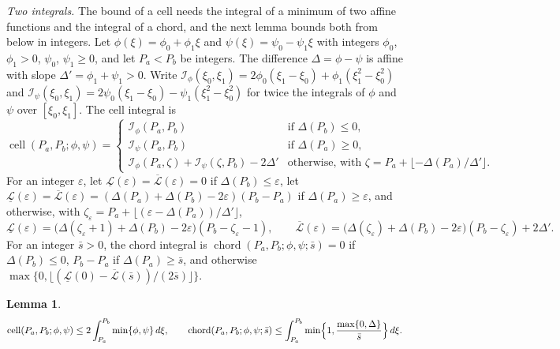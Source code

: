 \documentclass[11pt]{amsart}
\newtheorem{lemma}[theorem]{Lemma}
\theoremstyle{definition}
\numberwithin{equation}{section}
\newcommand{\lean}[1]{\ignorespaces}
\begin{document}
\emph{Two integrals.} The bound of a cell needs the integral of a minimum of two affine functions and the integral of a chord, and the next lemma bounds both from below in integers. Let $\phi(\xi)=\phi_0+\phi_1\xi$ and $\psi(\xi)=\psi_0-\psi_1\xi$ with integers $\phi_0$, $\phi_1>0$, $\psi_0$, $\psi_1\ge0$, and let $P_a<P_b$ be integers. The difference $\Delta=\phi-\psi$ is affine with slope $\Delta'=\phi_1+\psi_1>0$. Write $\mathcal I_\phi(\xi_0,\xi_1)=2\phi_0(\xi_1-\xi_0)+\phi_1(\xi_1^2-\xi_0^2)$ and $\mathcal I_\psi(\xi_0,\xi_1)=2\psi_0(\xi_1-\xi_0)-\psi_1(\xi_1^2-\xi_0^2)$ for twice the integrals of $\phi$ and $\psi$ over $[\xi_0,\xi_1]$. The cell integral is
\[
\operatorname{cell}(P_a,P_b;\phi,\psi)=\begin{cases}\mathcal I_\phi(P_a,P_b)&\text{if }\Delta(P_b)\le0,\\ \mathcal I_\psi(P_a,P_b)&\text{if }\Delta(P_a)\ge0,\\ \mathcal I_\phi(P_a,\zeta)+\mathcal I_\psi(\zeta,P_b)-2\Delta'&\text{otherwise, with }\zeta=P_a+\lfloor-\Delta(P_a)/\Delta'\rfloor.\end{cases}
\]
For an integer $\varepsilon$, let $\underline{\mathcal L}(\varepsilon)=\overline{\mathcal L}(\varepsilon)=0$ if $\Delta(P_b)\le\varepsilon$, let $\underline{\mathcal L}(\varepsilon)=\overline{\mathcal L}(\varepsilon)=(\Delta(P_a)+\Delta(P_b)-2\varepsilon)(P_b-P_a)$ if $\Delta(P_a)\ge\varepsilon$, and otherwise, with $\zeta_\varepsilon=P_a+\lfloor(\varepsilon-\Delta(P_a))/\Delta'\rfloor$,
\[
\underline{\mathcal L}(\varepsilon)=\bigl(\Delta(\zeta_\varepsilon+1)+\Delta(P_b)-2\varepsilon\bigr)(P_b-\zeta_\varepsilon-1),\qquad\overline{\mathcal L}(\varepsilon)=\bigl(\Delta(\zeta_\varepsilon)+\Delta(P_b)-2\varepsilon\bigr)(P_b-\zeta_\varepsilon)+2\Delta'.
\]
For an integer $\bar s>0$, the chord integral is $\operatorname{chord}(P_a,P_b;\phi,\psi;\bar s)=0$ if $\Delta(P_b)\le0$, $P_b-P_a$ if $\Delta(P_a)\ge\bar s$, and otherwise $\max\{0,\lfloor(\underline{\mathcal L}(0)-\overline{\mathcal L}(\bar s))/(2\bar s)\rfloor\}$.

\begin{lemma}\label{lem:intint}\lean{Robbins.Cert.SO.cell2_le, Robbins.Cert.SO.pos2_fst_le, Robbins.Cert.SO.le_pos2_snd, Robbins.Cert.SO.chord_le}
\[
\operatorname{cell}(P_a,P_b;\phi,\psi)\le2\int_{P_a}^{P_b}\min\{\phi,\psi\}\,d\xi,\qquad \operatorname{chord}(P_a,P_b;\phi,\psi;\bar s)\le\int_{P_a}^{P_b}\min\Bigl\{1,\frac{\max\{0,\Delta\}}{\bar s}\Bigr\}\,d\xi.
\]
\end{lemma}
\end{document}
